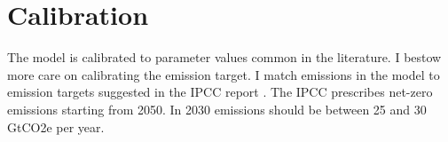 \section{Calibration}\label{sec:calib}

The model is calibrated to parameter values common in the literature. I bestow more care on  calibrating the emission target. 
I match emissions in the model to emission targets suggested in the IPCC report \citep{Rogelj2018MitigationDevelopment.}. 
The IPCC prescribes net-zero emissions starting from 2050. In 2030 emissions should be between 25 and 30 GtCO2e per year.


